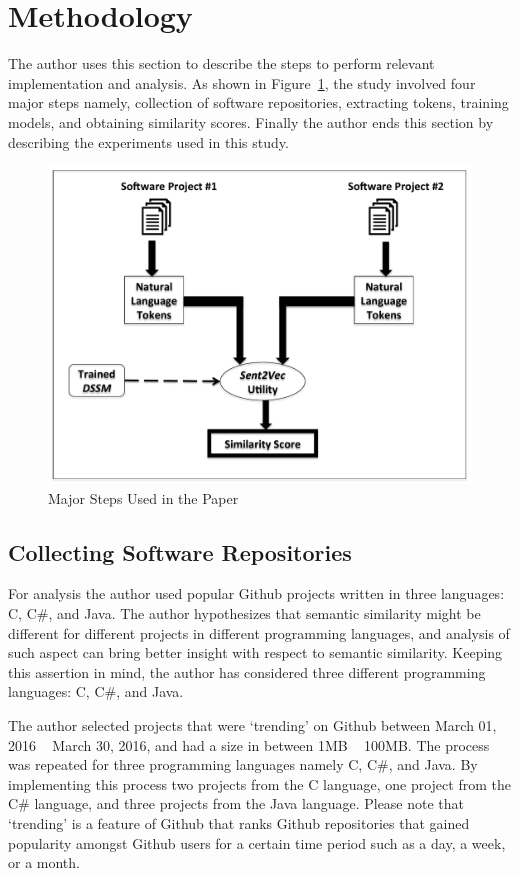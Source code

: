 \documentclass[conference]{IEEEtran}
\begin{document}
\section{Methodology}
\label{meth}
The author uses this section to describe the steps to perform relevant implementation and analysis. As shown in Figure~\ref{fig-meth}, the study involved four major steps namely, collection of software repositories, extracting tokens, training models, and obtaining similarity scores. Finally the author ends this section by describing the experiments used in this study.    
\begin{figure}[htbp]
\centering
\includegraphics[scale=0.35]{plots/Diagram.pdf}
\caption{Major Steps Used in the Paper}
\label{fig-meth}
\end{figure}

\subsection{Collecting Software Repositories}
\label{proj_collect}
For analysis the author used popular Github projects written in three languages: C, C\#, and Java. The author hypothesizes that semantic similarity might be different for different projects in different programming languages, and analysis of such aspect can bring better insight with respect to semantic similarity. Keeping this assertion in mind, the author has considered three different programming languages: C, C\#, and Java. 

The author selected projects that were `trending' on Github between March 01, 2016 ~ March 30, 2016, and had a size in between 1MB ~ 100MB. The process was repeated for three programming languages namely C, C\#, and Java.  By implementing this process two projects from the C language, one project from the C\# language, and three projects from the Java language. Please note that `trending' is a feature of Github that ranks Github repositories that gained popularity amongst Github users for a certain time period such as a day, a week, or a month. 
\end{document}
